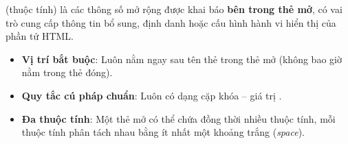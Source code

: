 \begin{conceptBox}
 (thuộc tính) là các thông số mở rộng được khai báo \textbf{bên trong thẻ mở}, có vai trò cung cấp thông tin bổ sung, định danh hoặc cấu hình hành vi hiển thị của phần tử HTML.
\begin{itemize}[leftmargin=1.5em, itemsep=2pt, parsep=0pt]
    \item \textbf{Vị trí bắt buộc}: Luôn nằm ngay sau tên thẻ trong thẻ mở (không bao giờ nằm trong thẻ đóng).
    \item \textbf{Quy tắc cú pháp chuẩn}: Luôn có dạng cặp khóa -- giá trị .
    \item \textbf{Đa thuộc tính}: Một thẻ mở có thể chứa đồng thời nhiều thuộc tính, mỗi thuộc tính phân tách nhau bằng ít nhất một khoảng trắng (\textit{space}).
\end{itemize}
\end{conceptBox}

